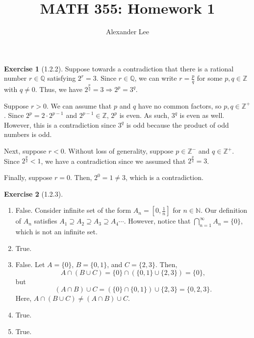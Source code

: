 \documentclass{amsart}
\title{MATH 355: Homework 1}
\author{Alexander Lee}
\theoremstyle{definition}
\newtheorem{exercise}{Exercise}
\newcommand{\N}{\mathbb{N}}
\newcommand{\Z}{\mathbb{Z}}
\newcommand{\Q}{\mathbb{Q}}
\begin{document}
\maketitle

\begin{exercise}[1.2.2]
  Suppose towards a contradiction that there is a rational number $r \in \Q$
  satisfying $2^r = 3$. Since $r \in \Q$, we can write $r = \frac{p}{q}$ for
  some $p, q \in \Z$ with $q \neq 0$. Thus, we have $2^\frac{p}{q} = 3
  \Rightarrow 2^p = 3^q$.

  Suppose $r > 0$. We can assume that $p$ and $q$ have no common factors, so
  $p, q \in \Z^+$. Since $2^p = 2 \cdot 2^{p-1}$ and $2^{p-1} \in \Z$, $2^p$ is
  even. As such, $3^q$ is even as well. However, this is a contradiction since
  $3^q$ is odd because the product of odd numbers is odd.

  Next, suppose $r < 0$. Without loss of generality, suppose $p \in \Z^-$ and $q
  \in \Z^+$. Since $2^\frac{p}{q} < 1$, we have a contradiction since we assumed
  that $2^\frac{p}{q} = 3$.

  Finally, suppose $r = 0$. Then, $2^0 = 1 \neq 3$, which is a contradiction.
\end{exercise}

\begin{exercise}[1.2.3]
  \begin{enumerate}[label={(\alph*)}]
    \item False. Consider infinite set of the form $A_n = [0, \frac{1}{n}]$ for
      $n \in \N$. Our definition of $A_n$ satisfies $A_1 \supseteq A_2 \supseteq
      A_3 \supseteq A_4 \cdots$. However, notice that $\bigcap_{n=1}^{\infty}
      A_n = \{0\}$, which is not an infinite set.
    \item True.
    \item False. Let $A = \{0\}$, $B = \{0, 1\}$, and $C = \{2, 3\}$. Then,
      \[
        A \cap (B \cup C) = \{0\} \cap (\{0, 1\} \cup \{2, 3\}) = \{0\},
      \]
      but
      \[
        (A \cap B) \cup C = (\{0\} \cap \{0, 1\}) \cup \{2, 3\} = \{0, 2, 3\}.
      \]
      Here, $A \cap (B \cup C) \neq (A \cap B) \cup C$.
    \item True.
    \item True.
  \end{enumerate}
\end{exercise}
\end{document}
